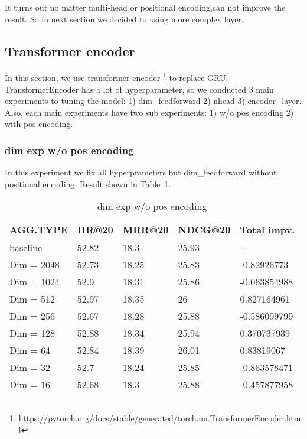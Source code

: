 \documentclass{article}
\begin{document}
It turns out no matter multi-head or positional encoding,can not improve the result.
So in next section we decided to using more complex layer.

\subsection{Transformer encoder}

In this section, we use transformer encoder
\footnote{\url{https://pytorch.org/docs/stable/generated/torch.nn.TransformerEncoder.html}}
to replace GRU.
TransformerEncoder has a lot of hyperparameter, so we conducted
3 main experiments to tuning the model:
1) dim\_feedforward 2) nhead 3) encoder\_layer.
Also, each main experiments have two sub experiments:
1) w/o pos encoding 2) with pos encoding.

\subsubsection{dim exp w/o pos encoding}

In this experiment we fix all hyperprameters but dim\_feedforward
without positional encoding. Result shown in Table~\ref{dim exp w/o pos encoding}.

\begin{table}
    \caption{dim exp w/o pos encoding}
    \label{dim exp w/o pos encoding}
    \centering
    \begin{tabular}{lllll}
        \toprule
        AGG.TYPE   & HR@20 & MRR@20 & NDCG@20 & Total impv.  \\
        \midrule
        baseline   & 52.82 & 18.3   & 25.93   & -            \\
        Dim = 2048 & 52.73 & 18.25  & 25.83   & -0.82926773  \\
        Dim = 1024 & 52.9  & 18.31  & 25.86   & -0.063854988 \\
        Dim = 512  & 52.97 & 18.35  & 26      & 0.827164961  \\
        Dim = 256  & 52.67 & 18.28  & 25.88   & -0.586099799 \\
        Dim = 128  & 52.88 & 18.34  & 25.94   & 0.370737939  \\
        Dim = 64   & 52.84 & 18.39  & 26.01   & 0.83819067   \\
        Dim = 32   & 52.7  & 18.24  & 25.85   & -0.863578471 \\
        Dim = 16   & 52.68 & 18.3   & 25.88   & -0.457877958 \\
        \bottomrule
    \end{tabular}
\end{table}
\end{document}
